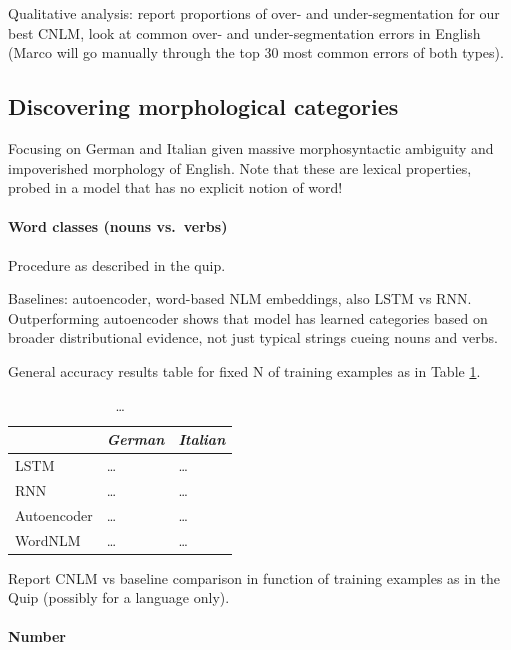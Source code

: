 Qualitative analysis: report proportions of over- and
under-segmentation for our best CNLM, look at common over- and
under-segmentation errors in English (Marco will go manually
through the top 30 most common errors of both types).

\subsection{Discovering morphological categories}
\label{sec:categories}

Focusing on German and Italian given massive morphosyntactic ambiguity
and impoverished morphology of English. Note that these are lexical
properties, probed in a model that has no explicit notion of word!

\paragraph{Word classes (nouns vs.~verbs)}

Procedure as described in the quip.

Baselines: autoencoder, word-based NLM embeddings, also LSTM vs
RNN. Outperforming autoencoder shows that model has learned categories
based on broader distributional evidence, not just typical strings
cueing nouns and verbs.

General accuracy results table for fixed N of training examples as in Table \ref{tab:pos-results}.

\begin{table}[t]
  \begin{center}
    \begin{tabular}{l|l|l}
      \multicolumn{1}{c}{}&\emph{German}&\emph{Italian}\\
      \hline
      LSTM&\ldots&\ldots\\
      RNN&\ldots&\ldots\\
      Autoencoder&\ldots&\ldots\\
      WordNLM&\ldots&\ldots\\
    \end{tabular}
  \end{center}
  \caption{\label{tab:pos-results} \ldots}
\end{table}

Report CNLM vs baseline comparison in function of training examples as in the Quip (possibly for a language only).

\paragraph{Number}

